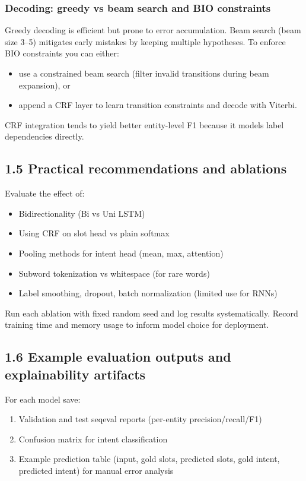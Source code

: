 \documentclass[conference]{IEEEtran}
\begin{document}
\subsubsection{Decoding: greedy vs beam search and BIO constraints}
Greedy decoding is efficient but prone to error accumulation. Beam search (beam size 3--5) mitigates early mistakes by keeping multiple hypotheses. To enforce BIO constraints you can either:
\begin{itemize}
  \item use a constrained beam search (filter invalid transitions during beam expansion), or
  \item append a CRF layer to learn transition constraints and decode with Viterbi.
\end{itemize}
CRF integration tends to yield better entity-level F1 because it models label dependencies directly.

\subsection{1.5 Practical recommendations and ablations}
Evaluate the effect of:
\begin{itemize}
  \item Bidirectionality (Bi vs Uni LSTM)
  \item Using CRF on slot head vs plain softmax
  \item Pooling methods for intent head (mean, max, attention)
  \item Subword tokenization vs whitespace (for rare words)
  \item Label smoothing, dropout, batch normalization (limited use for RNNs)
\end{itemize}
Run each ablation with fixed random seed and log results systematically. Record training time and memory usage to inform model choice for deployment.

\subsection{1.6 Example evaluation outputs and explainability artifacts}
For each model save:
\begin{enumerate}
  \item Validation and test seqeval reports (per-entity precision/recall/F1)
  \item Confusion matrix for intent classification
  \item Example prediction table (input, gold slots, predicted slots, gold intent, predicted intent) for manual error analysis
\end{enumerate}
\end{document}
